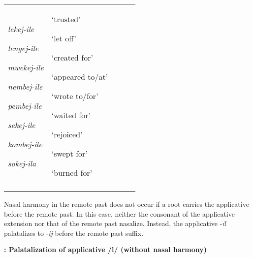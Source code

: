 \documentclass[output=paper]{langsci/langscibook}
\begin{document}
\begin{tabular}{lllll}
{\mdseries \emph{lekej-ile}}

{\mdseries \emph{lengej-ile}}

{\mdseries \emph{mwekej-ile}}

{\mdseries \emph{nembej-ile}}

{\mdseries \emph{pembej-ile}}

{\mdseries \emph{sekej-ile}}

{\mdseries \emph{kombej-ile}}

\mdseries \emph{sokej-ila} & {\mdseries ‘trusted’}

{\mdseries ‘let off’}

{\mdseries ‘created for’}

{\mdseries ‘appeared to/at’}

{\mdseries ‘wrote to/for’}

{\mdseries ‘waited for’}

{\mdseries ‘rejoiced’}

{\mdseries ‘swept for’}

\mdseries ‘burned for’\\
\lspbottomrule
\end{tabular}
\begin{styleBodyTextIndent}
Nasal harmony in the remote past does not occur if a root carries the applicative before the remote past. In this case, neither the consonant of the applicative extension nor that of the remote past nasalize. Instead, the applicative -\emph{il} palatalizes to -\emph{ij} before the remote past suffix. 
\end{styleBodyTextIndent}

\begin{styleBodyTextIndent}
\textbf{: Palatalization of applicative /l/ (without nasal harmony)  }
\end{styleBodyTextIndent}
\end{document}
